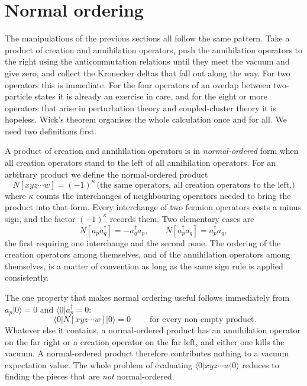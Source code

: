 \section{Normal ordering}
\label{sec:normalordering}

The manipulations of the previous sections all follow the same pattern.  Take
a product of creation and annihilation operators, push the annihilation
operators to the right using the anticommutation relations until they meet the
vacuum and give zero, and collect the Kronecker deltas that fall out along the
way.  For two operators this is immediate.  For the four operators of an
overlap between two-particle states it is already an exercise in care, and for
the eight or more operators that arise in perturbation theory and
coupled-cluster theory it is hopeless.  Wick's theorem organises the whole
calculation once and for all.  We need two definitions first.

A product of creation and annihilation operators is in \emph{normal-ordered}
form when all creation operators stand to the left of all annihilation
operators.  For an arbitrary product we define the normal-ordered product
\begin{equation}
  N\left[xyz\cdots w\right] = (-1)^{\kappa}\,
    \Big(\text{the same operators, all creation operators to the left,}
    \Big)
  \label{eq:3-normalorder}
\end{equation}
where $\kappa$ counts the interchanges of neighbouring operators needed to
bring the product into that form.  Every interchange of two fermion operators
costs a minus sign, and the factor $(-1)^{\kappa}$ records them.  Two
elementary cases are
\begin{equation}
  N\left[a_p a_q^{\dagger}\right] = -a_q^{\dagger}a_p ,
  \qquad
  N\left[a_p^{\dagger} a_q\right] = a_p^{\dagger}a_q ,
  \label{eq:3-normalexamples}
\end{equation}
the first requiring one interchange and the second none.  The ordering of the
creation operators among themselves, and of the annihilation operators among
themselves, is a matter of convention as long as the same sign rule is applied
consistently.

The one property that makes normal ordering useful follows immediately from
$a_p\vert 0\rangle = 0$ and $\langle 0\vert a_p^{\dagger}=0$:
\begin{equation}
  \boxed{\;\langle 0\vert N\left[xyz\cdots w\right]\vert 0\rangle = 0\;}
  \qquad\text{for every non-empty product.}
  \label{eq:3-normalvanishes}
\end{equation}
Whatever else it contains, a normal-ordered product has an annihilation
operator on the far right or a creation operator on the far left, and either
one kills the vacuum.  A normal-ordered product therefore contributes nothing
to a vacuum expectation value.  The whole problem of evaluating
$\langle 0\vert xyz\cdots w\vert 0\rangle$ reduces to finding the pieces that
are \emph{not} normal-ordered.

